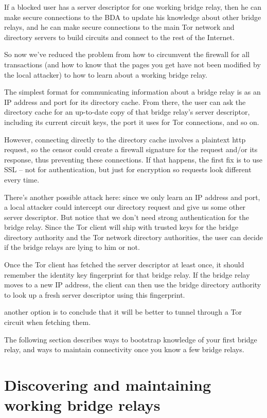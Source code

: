 \documentclass{llncs}
\begin{document}
If a blocked user has a server descriptor for one working bridge relay,
then he can make secure connections to the BDA to update his knowledge
about other bridge
relays, and he can make secure connections to the main Tor network
and directory servers to build circuits and connect to the rest of
the Internet.

So now we've reduced the problem from how to circumvent the firewall
for all transactions (and how to know that the pages you get have not
been modified by the local attacker) to how to learn about a working
bridge relay.

The simplest format for communicating information about a bridge relay
is as an IP address and port for its directory cache. From there, the
user can ask the directory cache for an up-to-date copy of that bridge
relay's server descriptor, including its current circuit keys, the port
it uses for Tor connections, and so on.

However, connecting directly to the directory cache involves a plaintext
http request, so the censor could create a firewall signature for the
request and/or its response, thus preventing these connections. If that
happens, the first fix is to use SSL -- not for authentication, but
just for encryption so requests look different every time.

There's another possible attack here: since we only learn an IP address
and port, a local attacker could intercept our directory request and
give us some other server descriptor. But notice that we don't need
strong authentication for the bridge relay. Since the Tor client will
ship with trusted keys for the bridge directory authority and the Tor
network directory authorities, the user can decide if the bridge relays
are lying to him or not.

Once the Tor client has fetched the server descriptor at least once,
it should remember the identity key fingerprint for that bridge relay.
If the bridge relay moves to a new IP address, the client can then
use the bridge directory authority to look up a fresh server descriptor
using this fingerprint.

another option is to conclude
that it will be better to tunnel through a Tor circuit when fetching them.

The following section describes ways to bootstrap knowledge of your first
bridge relay, and ways to maintain connectivity once you know a few
bridge relays.

\section{Discovering and maintaining working bridge relays}
\end{document}
